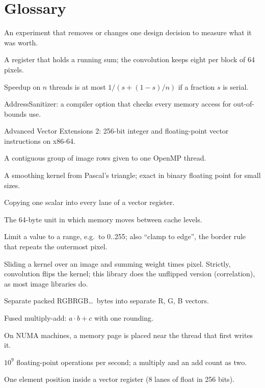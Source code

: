 \chapter{Glossary}

\begin{description}[leftmargin=3.4cm,style=nextline,itemsep=3pt]
\item[ablation] An experiment that removes or changes one design decision to measure what it was worth.
\item[accumulator] A register that holds a running sum; the convolution keeps eight per block of 64 pixels.
\item[Amdahl's law] Speedup on $n$ threads is at most $1/(s+(1-s)/n)$ if a fraction $s$ is serial.
\item[ASAN] AddressSanitizer: a compiler option that checks every memory access for out-of-bounds use.
\item[AVX2] Advanced Vector Extensions 2: 256-bit integer and floating-point vector instructions on x86-64.
\item[band] A contiguous group of image rows given to one OpenMP thread.
\item[binomial kernel] A smoothing kernel from Pascal's triangle; exact in binary floating point for small sizes.
\item[broadcast] Copying one scalar into every lane of a vector register.
\item[cache line] The 64-byte unit in which memory moves between cache levels.
\item[clamp] Limit a value to a range, e.g.\ to 0..255; also ``clamp to edge'', the border rule that repeats the outermost pixel.
\item[correlation / convolution] Sliding a kernel over an image and summing weight times pixel. Strictly, convolution flips the kernel; this library does the unflipped version (correlation), as most image libraries do.
\item[deinterleave] Separate packed RGBRGB\dots\ bytes into separate R, G, B vectors.
\item[FMA] Fused multiply-add: $a\cdot b+c$ with one rounding.
\item[first touch] On NUMA machines, a memory page is placed near the thread that first writes it.
\item[GFLOP/s] $10^9$ floating-point operations per second; a multiply and an add count as two.
\item[lane] One element position inside a vector register (8 lanes of float in 256 bits).

\end{description}
